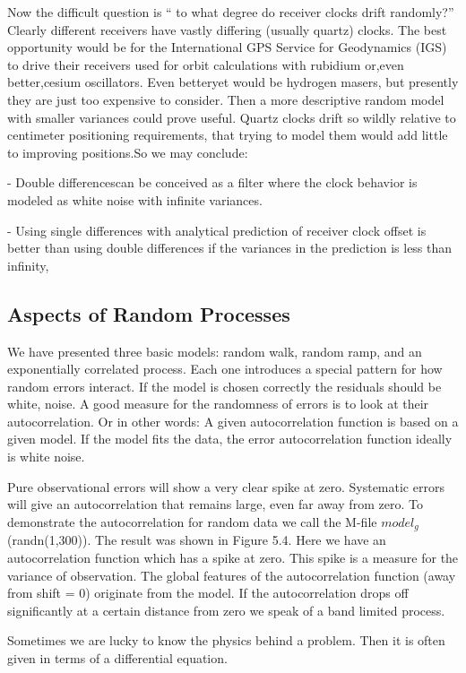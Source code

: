   Now the difficult question is “ to what degree do receiver clocks drift randomly?” Clearly different receivers have vastly differing (usually quartz) clocks. The best opportunity would be for the International GPS Service for Geodynamics (IGS) to drive their receivers used for orbit calculations with rubidium or,even better,cesium oscillators. Even betteryet would be hydrogen masers, but presently they are just too expensive to consider. Then a more descriptive random model with smaller variances could prove useful. Quartz clocks drift so wildly relative to centimeter positioning requirements, that trying to model them would add little to improving positions.So we may conclude:
  
  
   - Double differencescan be conceived as a filter where the clock behavior is modeled as white noise with infinite variances. 
   
   - Using single differences with analytical prediction of receiver clock offset is better than using double differences if the variances in the prediction is less than infinity,
 
 \subsection{Aspects of Random Processes }
 
  We have presented three basic models: random walk, random ramp, and an exponentially correlated process. Each one introduces a special pattern for how random errors interact. If the model is chosen correctly the residuals should be white, noise. A good measure for the randomness of errors is to look at their autocorrelation. Or in other words: A given autocorrelation function is based on a given model. If the model fits the data, the error autocorrelation function ideally is white noise.
  
   Pure observational errors will show a very clear spike at zero. Systematic errors will give an autocorrelation that remains large, even far away from zero. To demonstrate the autocorrelation for random data we call the M-file $ model_g $(randn(1,300)). The result was shown in Figure 5.4. Here we have an autocorrelation function which has a spike at zero. This spike is a measure for the variance of observation. The global features of the autocorrelation function (away from shift = 0) originate from the model. If the autocorrelation drops off significantly at a certain distance from zero we speak of a band limited process. 
   
   Sometimes we are lucky to know the physics behind a problem. Then it is often given in terms of a differential equation. 
   
